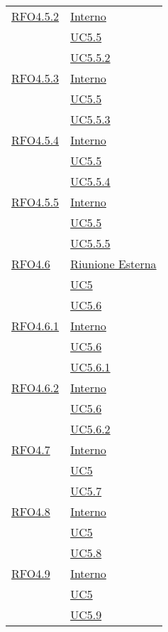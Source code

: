 \begin{longtable}{|>{\centering}m{5cm}|m{5cm}<{\centering}|}
\hyperlink{RFO4.5.2}{RFO4.5.2} & \hyperlink{Interno}{Interno}\\ &\hyperref[UC5.5]{UC5.5}\\ &\hyperref[UC5.5.2]{UC5.5.2}\\ \hline

\hyperlink{RFO4.5.3}{RFO4.5.3} &  \hyperlink{Interno}{Interno}\\ &\hyperref[UC5.5]{UC5.5}\\ &\hyperref[UC5.5.3]{UC5.5.3}\\ \hline

\hyperlink{RFO4.5.4}{RFO4.5.4} & \hyperlink{Interno}{Interno}\\ &\hyperref[UC5.5]{UC5.5}\\ &\hyperref[UC5.5.4]{UC5.5.4}\\ \hline

\hyperlink{RFO4.5.5}{RFO4.5.5} &\hyperlink{Interno}{Interno}\\ &\hyperref[UC5.5]{UC5.5}\\ &\hyperref[UC5.5.5]{UC5.5.5}\\ \hline

\hyperlink{RFO4.6}{RFO4.6} & \hyperlink{Riunione Esterna}{Riunione Esterna}\\ &\hyperref[UC5]{UC5}\\ &\hyperref[UC5.6]{UC5.6}\\ \hline

\hyperlink{RFO4.6.1}{RFO4.6.1} &  \hyperlink{Interno}{Interno}\\ &\hyperref[UC5.6]{UC5.6}\\ &\hyperref[UC5.6.1]{UC5.6.1}\\ \hline

\hyperlink{RFO4.6.2}{RFO4.6.2} &  \hyperlink{Interno}{Interno}\\ &\hyperref[UC5.6]{UC5.6}\\ &\hyperref[UC5.6.2]{UC5.6.2}\\ \hline

\hyperlink{RFO4.7}{RFO4.7} &\hyperlink{Interno}{Interno}\\ &\hyperref[UC5]{UC5}\\ &\hyperref[UC5.7]{UC5.7}\\ \hline

\hyperlink{RFO4.8}{RFO4.8} &  \hyperlink{Interno}{Interno}\\ &\hyperref[UC5]{UC5}\\ &\hyperref[UC5.8]{UC5.8}\\ \hline

\hyperlink{RFO4.9}{RFO4.9} &  \hyperlink{Interno}{Interno}\\ &\hyperref[UC5]{UC5}\\ &\hyperref[UC5.9]{UC5.9}\\ \hline


\end{longtable}
